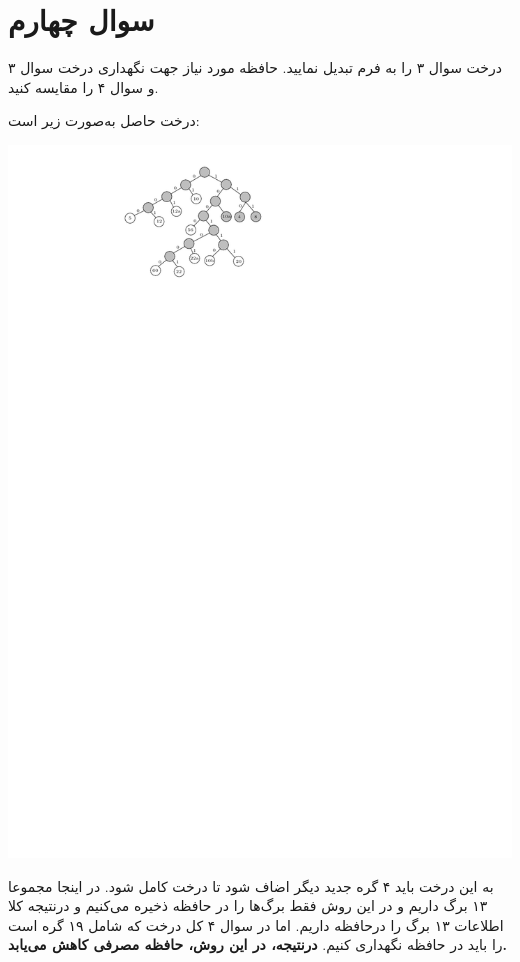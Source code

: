 \section{سوال چهارم}

درخت سوال ۳ را به فرم  تبدیل نمایید. حافظه مورد نیاز جهت نگهداری درخت سوال ۳ و سوال ۴ را مقایسه کنید.

\begin{qsolve}
	
	درخت  حاصل به‌صورت زیر است:
	
	\begin{center}
		\includegraphics*[width=0.5\linewidth]{pics/q4.pdf}
	\end{center}
	
	به این درخت باید ۴ گره جدید دیگر اضاف شود تا درخت کامل شود. در اینجا مجموعا ۱۳ برگ داریم و در این روش فقط برگ‌ها را در حافظه ذخیره می‌کنیم و درنتیجه کلا اطلاعات ۱۳ برگ را درحافظه داریم. اما در سوال ۴ کل درخت که شامل ۱۹ گره است را باید در حافظه نگهداری کنیم. \textbf{درنتیجه، در این روش، حافظه مصرفی کاهش می‌یابد.}
\end{qsolve}